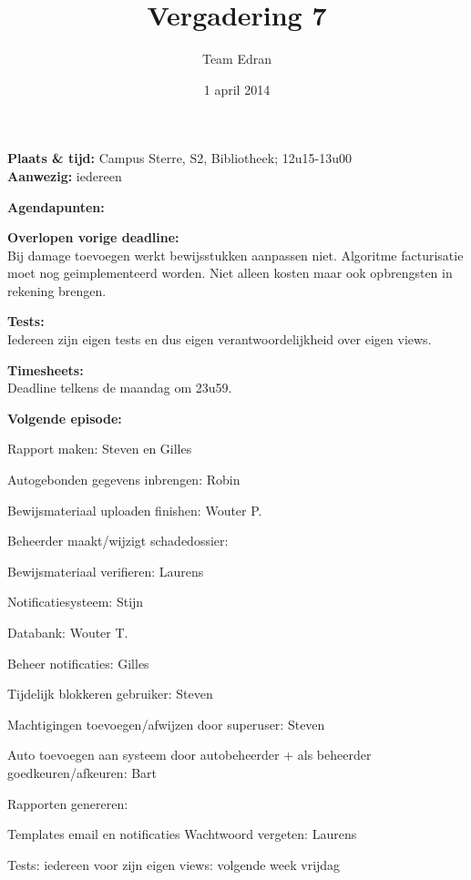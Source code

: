 \documentclass[11pt,a4paper,oneside]{article}
\title{Vergadering 7}
\author{Team Edran}
\date{1 april 2014}
\renewenvironment{itemize}[1]{\begin{compactitem}#1}{\end{compactitem}}
\begin{document}
\maketitle

\textbf{Plaats \& tijd:}
Campus Sterre, S2, Bibliotheek; 12u15-13u00\\
\textbf{Aanwezig:} iedereen\par
\textbf{Agendapunten:}
\begin{itemize}
\item \textbf{Overlopen vorige deadline:}\\
Bij damage toevoegen werkt bewijsstukken aanpassen niet. Algoritme facturisatie moet nog geimplementeerd worden. Niet alleen kosten maar ook opbrengsten in rekening brengen.

\item \textbf{Tests:\\}
Iedereen zijn eigen tests en dus eigen verantwoordelijkheid over eigen views.

\item \textbf{Timesheets:\\}
Deadline telkens de maandag om 23u59.

\item \textbf{Volgende episode:\\}
\begin{itemize}
\item Rapport maken: Steven en Gilles
\item Autogebonden gegevens inbrengen: Robin
\item Bewijsmateriaal uploaden finishen: Wouter P.
\item Beheerder maakt/wijzigt schadedossier:   
\item Bewijsmateriaal verifieren: Laurens
\item Notificatiesysteem: Stijn
\item Databank: Wouter T.
\item Beheer notificaties: Gilles
\item Tijdelijk blokkeren gebruiker: Steven
\item Machtigingen toevoegen/afwijzen door superuser: Steven
\item Auto toevoegen aan systeem door autobeheerder + als beheerder goedkeuren/afkeuren: Bart 
\item Rapporten genereren:  
\item Templates email en notificaties
\iem Wachtwoord vergeten: Laurens
\item Tests: iedereen voor zijn eigen views: volgende week vrijdag
\end{itemize}


\end{itemize}
\end{document}
